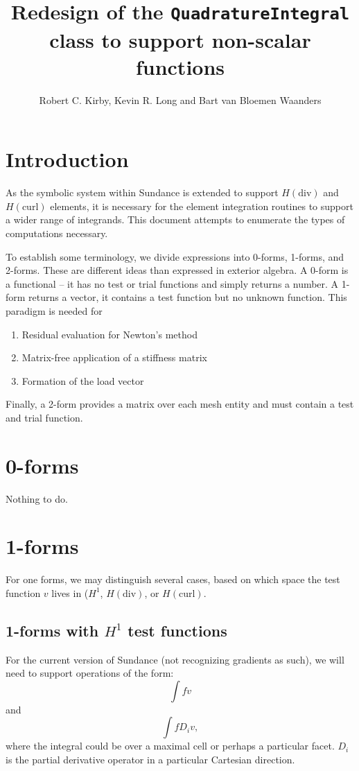\documentclass{article}
\author{Robert C. Kirby, Kevin R. Long and Bart van Bloemen Waanders}
\title{Redesign of the \texttt{QuadratureIntegral} class to support non-scalar functions}
\begin{document}
\maketitle

\section{Introduction}
As the symbolic system within Sundance is extended to support 
\( H(\mathrm{div}) \) and \( H(\mathrm{curl}) \) elements, it is
necessary for the element integration routines to support a wider
range of integrands.  This document attempts to enumerate the types
of computations necessary.

To establish some terminology, we divide expressions into
0-forms, 1-forms, and 2-forms.  These are different ideas than
expressed in exterior algebra.  A 0-form is a functional -- it has
no test or trial functions and simply returns a number.  A 1-form
returns a vector, it contains a test function but no unknown function.
This paradigm is needed for 
\begin{enumerate}
\item Residual evaluation for Newton's method
\item Matrix-free application of a stiffness matrix
\item Formation of the load vector
\end{enumerate}
Finally, a 2-form provides a matrix over each mesh entity and must
contain a test and trial function.

\section{0-forms}
Nothing to do.

\section{1-forms}
For one forms, we may distinguish several cases, based on which space
the test function \( v \) lives in (\(H^1\), \( H(\mathrm{div}) \), or
\( H(\mathrm{curl}) \).
\subsection{1-forms with \( H^1 \) test functions}
For the current version of Sundance (not recognizing gradients as
such), we will need to support operations of the form:
\[
\int f v
\]
and
\[
\int f D_i v,
\]
where the integral could be over a maximal cell or perhaps a
particular facet.  \( D_i \) is the partial derivative operator in
a particular Cartesian direction.
\end{document}
